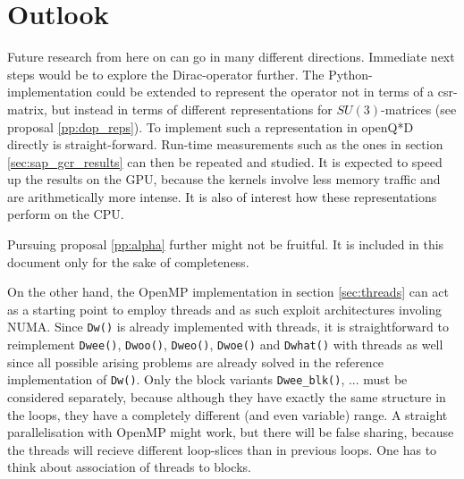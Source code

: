 \documentclass{article}
\theoremstyle{plain} %
\theoremstyle{convention} %
\theoremstyle{remark} %
\def\code#1{\texttt{#1}}
\numberwithin{equation}{section}
\begin{document}

\section{Outlook}

\label{sec:outlook}

Future research from here on can go in many different directions. Immediate next steps would be to explore the Dirac-operator further. The Python-implementation could be extended to represent the operator not in terms of a \acrshort{csr}-matrix, but instead in terms of different representations for $SU(3)$-matrices (see proposal \ref{pp:dop_reps}). To implement such a representation in openQ*D directly is straight-forward. Run-time measurements such as the ones in section \ref{sec:sap_gcr_results} can then be repeated and studied. It is expected to speed up the results on the GPU, because the kernels involve less memory traffic and are arithmetically more intense. It is also of interest how these representations perform on the CPU.

Pursuing proposal \ref{pp:alpha} further might not be fruitful. It is included in this document only for the sake of completeness.

On the other hand, the OpenMP implementation in section \ref{sec:threads} can act as a starting point to employ threads and as such exploit architectures involing NUMA. Since \code{Dw()} is already implemented with threads, it is straightforward to reimplement \code{Dwee()}, \code{Dwoo()}, \code{Dweo()}, \code{Dwoe()} and \code{Dwhat()} with threads as well since all possible arising problems are already solved in the reference implementation of \code{Dw()}. Only the block variants \code{Dwee\_blk()}, ... must be considered separately, because although they have exactly the same structure in the loops, they have a completely different (and even variable) range. A straight parallelisation with OpenMP might work, but there will be false sharing, because the threads will recieve different loop-slices than in previous loops. One has to think about association of threads to blocks.
\end{document}

